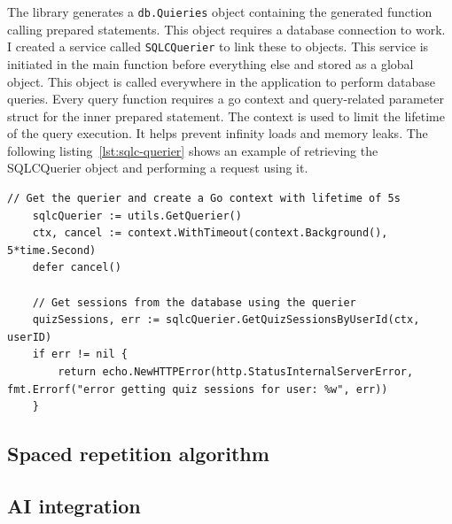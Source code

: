 The library generates a \texttt{db.Quieries} object containing the generated function calling prepared statements. This object requires a database connection to work. I created a service called \texttt{SQLCQuerier} to link these to objects. This service is initiated in the main function before everything else and stored as a global object. This object is called everywhere in the application to perform database queries. Every query function requires a go context and query-related parameter struct for the inner prepared statement. The context is used to limit the lifetime of the query execution. It helps prevent infinity loads and memory leaks. The following listing~\ref{lst:sqlc-querier} shows an example of retrieving the SQLCQuerier object and performing a request using it.

\begin{lstlisting}[caption=Using the SQLCQuerier,label=lst:sqlc-querier]
	// Get the querier and create a Go context with lifetime of 5s
	sqlcQuerier := utils.GetQuerier()
	ctx, cancel := context.WithTimeout(context.Background(), 5*time.Second)
	defer cancel()

	// Get sessions from the database using the querier
	quizSessions, err := sqlcQuerier.GetQuizSessionsByUserId(ctx, userID)
	if err != nil {
		return echo.NewHTTPError(http.StatusInternalServerError, fmt.Errorf("error getting quiz sessions for user: %w", err))
	}
\end{lstlisting}

\subsection{Spaced repetition algorithm}

\subsection{AI integration}
